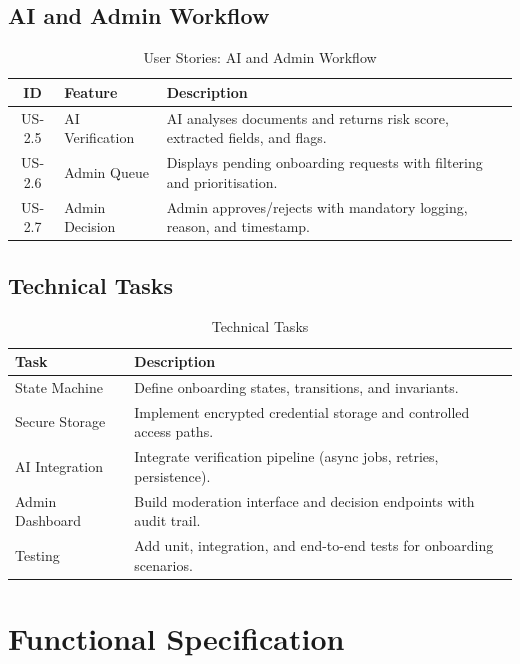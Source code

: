 \subsection{AI and Admin Workflow}
\begin{table}[H]
\centering
\begin{tabularx}{\textwidth}{|c|X|X|}
\hline
\rowcolor{medgray}
\textbf{ID} & \textbf{Feature} & \textbf{Description} \\
\hline

US-2.5 & AI Verification & AI analyses documents and returns risk score, extracted fields, and flags. \\ \hline
US-2.6 & Admin Queue & Displays pending onboarding requests with filtering and prioritisation. \\ \hline
US-2.7 & Admin Decision & Admin approves/rejects with mandatory logging, reason, and timestamp. \\ \hline

\end{tabularx}
\caption{User Stories: AI and Admin Workflow}
\end{table}

\subsection{Technical Tasks}
\begin{table}[H]
\centering
\begin{tabularx}{\textwidth}{|X|X|}
\hline
\rowcolor{medgray}
\textbf{Task} & \textbf{Description} \\
\hline

State Machine & Define onboarding states, transitions, and invariants. \\ \hline
Secure Storage & Implement encrypted credential storage and controlled access paths. \\ \hline
AI Integration & Integrate verification pipeline (async jobs, retries, persistence). \\ \hline
Admin Dashboard & Build moderation interface and decision endpoints with audit trail. \\ \hline
Testing & Add unit, integration, and end-to-end tests for onboarding scenarios. \\ \hline

\end{tabularx}
\caption{Technical Tasks}
\end{table}

\section{Functional Specification}
\label{sec:sprint2-functional}


